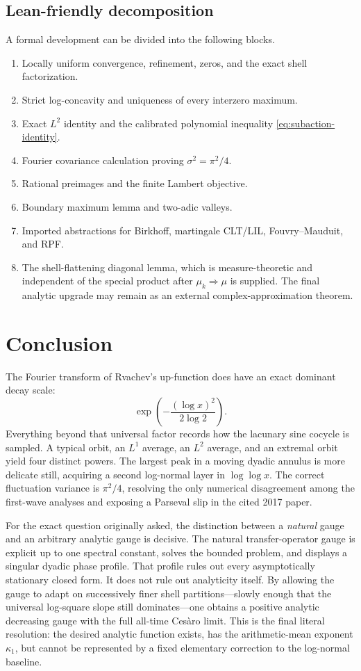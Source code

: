 \documentclass[11pt]{article}
\theoremstyle{definition}
\theoremstyle{remark}
\begin{document}
\subsection{Lean-friendly decomposition}

A formal development can be divided into the following blocks.
\begin{enumerate}
\item Locally uniform convergence, refinement, zeros, and the exact shell
factorization.
\item Strict log-concavity and uniqueness of every interzero maximum.
\item Exact \(L^2\) identity and the calibrated polynomial inequality
\eqref{eq:subaction-identity}.
\item Fourier covariance calculation proving \(\sigma^2=\pi^2/4\).
\item Rational preimages and the finite Lambert objective.
\item Boundary maximum lemma and two-adic valleys.
\item Imported abstractions for Birkhoff, martingale CLT/LIL, Fouvry--Mauduit,
and RPF.
\item The shell-flattening diagonal lemma, which is measure-theoretic and
independent of the special product after \(\mu_k\Rightarrow\mu\) is supplied.
The final analytic upgrade may remain as an external complex-approximation
theorem.
\end{enumerate}

\section{Conclusion}

The Fourier transform of Rvachev's up-function does have an exact dominant
decay scale:
\[
 \exp\!\left(-\frac{(\log x)^2}{2\log2}\right).
\]
Everything beyond that universal factor records how the lacunary sine cocycle
is sampled.  A typical orbit, an \(L^1\) average, an \(L^2\) average, and an
extremal orbit yield four distinct powers.  The largest peak in a moving
dyadic annulus is more delicate still, acquiring a second log-normal layer in
\(\log\log x\).  The correct fluctuation variance is \(\pi^2/4\), resolving
the only numerical disagreement among the first-wave analyses and exposing a
Parseval slip in the cited 2017 paper.

For the exact question originally asked, the distinction between a
\emph{natural} gauge and an arbitrary analytic gauge is decisive.  The natural
transfer-operator gauge is explicit up to one spectral constant, solves the
bounded problem, and displays a singular dyadic phase profile.  That profile
rules out every asymptotically stationary closed form.  It does not rule out
analyticity itself.  By allowing the gauge to adapt on successively finer
shell partitions---slowly enough that the universal log-square slope still
dominates---one obtains a positive analytic decreasing gauge with the full
all-time Ces\`aro limit.  This is the final literal resolution: the desired
analytic function exists, has the arithmetic-mean exponent \(\kappa_1\), but
cannot be represented by a fixed elementary correction to the log-normal
baseline.
\end{document}
